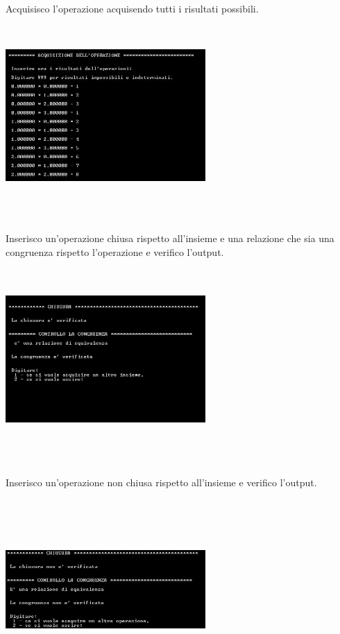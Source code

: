 \documentclass[11pt,a4paper,titlepage,block]{article}
\begin{document}
\\
Acquisisco l'operazione acquisendo tutti i risultati possibili.\\
\includegraphics[width=3in,height=3in,viewport=0 0 300 300]{../Screenshots/Capture4.JPG}\\
\\
\newpage
Inserisco un'operazione chiusa rispetto all'insieme e una relazione che sia una congruenza rispetto l'operazione e verifico l'output.\\
\includegraphics[width=3in,height=3in,viewport=0 0 300 300]{../Screenshots/Capture7.JPG}\\
\\
Inserisco un'operazione non chiusa rispetto all'insieme e verifico l'output.\\
\includegraphics[width=3in,height=3in,viewport=0 0 300 300]{../Screenshots/Capture8.JPG}\\
\end{document}
